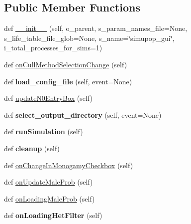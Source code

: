 \subsection*{Public Member Functions}
\begin{DoxyCompactItemize}
\item 
def \hyperlink{classnegui_1_1pgguisimupop__experimental_1_1PGGuiSimuPop_ac35cb785f7a24ef4433744c185ebf6aa}{\+\_\+\+\_\+init\+\_\+\+\_\+} (self, o\+\_\+parent, s\+\_\+param\+\_\+names\+\_\+file=None, s\+\_\+life\+\_\+table\+\_\+file\+\_\+glob=None, s\+\_\+name=\char`\"{}simupop\+\_\+gui\char`\"{}, i\+\_\+total\+\_\+processes\+\_\+for\+\_\+sims=1)
\item 
def \hyperlink{classnegui_1_1pgguisimupop__experimental_1_1PGGuiSimuPop_ac4d931e8f9892a3a9359829fb2f89335}{on\+Cull\+Method\+Selection\+Change} (self)
\item 
def {\bfseries load\+\_\+config\+\_\+file} (self, event=None)\hypertarget{classnegui_1_1pgguisimupop__experimental_1_1PGGuiSimuPop_abfcfdd2a0f79b843b0200c4cde63c0b6}{}\label{classnegui_1_1pgguisimupop__experimental_1_1PGGuiSimuPop_abfcfdd2a0f79b843b0200c4cde63c0b6}

\item 
def \hyperlink{classnegui_1_1pgguisimupop__experimental_1_1PGGuiSimuPop_a8e44626bb0deceea22ca871d49dc0de5}{update\+N0\+Entry\+Box} (self)
\item 
def {\bfseries select\+\_\+output\+\_\+directory} (self, event=None)\hypertarget{classnegui_1_1pgguisimupop__experimental_1_1PGGuiSimuPop_ac9a5c36dc9ff0403d3e34377556baaf1}{}\label{classnegui_1_1pgguisimupop__experimental_1_1PGGuiSimuPop_ac9a5c36dc9ff0403d3e34377556baaf1}

\item 
def {\bfseries run\+Simulation} (self)\hypertarget{classnegui_1_1pgguisimupop__experimental_1_1PGGuiSimuPop_a56afb2bb655fcb29641aae5c9c7d0c72}{}\label{classnegui_1_1pgguisimupop__experimental_1_1PGGuiSimuPop_a56afb2bb655fcb29641aae5c9c7d0c72}

\item 
def {\bfseries cleanup} (self)\hypertarget{classnegui_1_1pgguisimupop__experimental_1_1PGGuiSimuPop_a5427ac2c5586aa78d0876db75ce85b81}{}\label{classnegui_1_1pgguisimupop__experimental_1_1PGGuiSimuPop_a5427ac2c5586aa78d0876db75ce85b81}

\item 
def \hyperlink{classnegui_1_1pgguisimupop__experimental_1_1PGGuiSimuPop_ab6eb84f4fdea732994155f69ffceeab5}{on\+Change\+In\+Monogamy\+Checkbox} (self)
\item 
def \hyperlink{classnegui_1_1pgguisimupop__experimental_1_1PGGuiSimuPop_a704ee08fed47fdab981c9e871f50d1b9}{on\+Update\+Male\+Prob} (self)
\item 
def \hyperlink{classnegui_1_1pgguisimupop__experimental_1_1PGGuiSimuPop_ab0c64eb88e6d24ff9f6e7e52813be21c}{on\+Loading\+Male\+Prob} (self)
\item 
def {\bfseries on\+Loading\+Het\+Filter} (self)\hypertarget{classnegui_1_1pgguisimupop__experimental_1_1PGGuiSimuPop_a0481b63ae3ae6607ef1f022c7881b659}{}\label{classnegui_1_1pgguisimupop__experimental_1_1PGGuiSimuPop_a0481b63ae3ae6607ef1f022c7881b659}


\end{DoxyCompactItemize}
